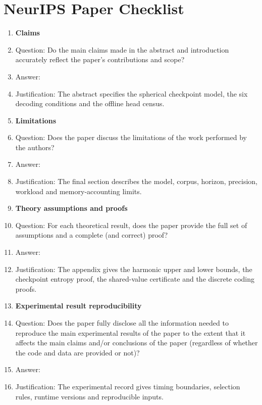 \section*{NeurIPS Paper Checklist}
\begin{enumerate}

\item {\bf Claims}
    \item[] Question: Do the main claims made in the abstract and introduction accurately reflect the paper's contributions and scope?
    \item[] Answer: \answerYes{}
    \item[] Justification: The abstract specifies the spherical checkpoint model, the six decoding conditions and the offline head census.


\item {\bf Limitations}
    \item[] Question: Does the paper discuss the limitations of the work performed by the authors?
    \item[] Answer: \answerYes{}
    \item[] Justification: The final section describes the model, corpus, horizon, precision, workload and memory-accounting limits.


\item {\bf Theory assumptions and proofs}
    \item[] Question: For each theoretical result, does the paper provide the full set of assumptions and a complete (and correct) proof?
    \item[] Answer: \answerYes{}
    \item[] Justification: The appendix gives the harmonic upper and lower bounds, the checkpoint entropy proof, the shared-value certificate and the discrete coding proofs.


    \item {\bf Experimental result reproducibility}
    \item[] Question: Does the paper fully disclose all the information needed to reproduce the main experimental results of the paper to the extent that it affects the main claims and/or conclusions of the paper (regardless of whether the code and data are provided or not)?
    \item[] Answer: \answerYes{}
    \item[] Justification: The experimental record gives timing boundaries, selection rules, runtime versions and reproducible inputs.




\end{enumerate}
